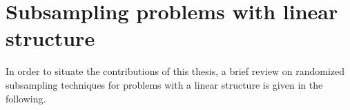\documentclass[twoside,11pt]{book}
\numberwithin{theorem}{chapter}
\numberwithin{definition}{chapter}
\numberwithin{proposition}{chapter}
\numberwithin{corollary}{chapter}
\numberwithin{example}{chapter}
\numberwithin{lemma}{chapter}
\numberwithin{assumption}{chapter}
\numberwithin{equation}{chapter}
\numberwithin{figure}{chapter}
\begin{document}




 






\section{Subsampling problems with linear structure}

In order to situate the contributions of this thesis, a brief review on randomized subsampling techniques for problems with a linear structure is given in the following. 
\end{document}

